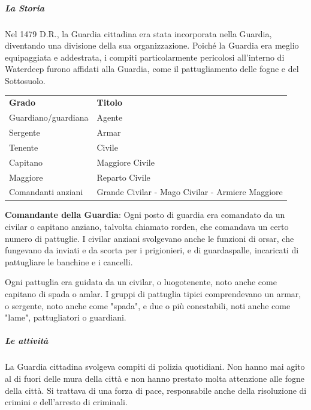 \documentclass{article}
\begin{document}
\subparagraph{La Storia}
Nel 1479 D.R., la Guardia cittadina era stata incorporata nella Guardia, diventando una divisione della sua organizzazione. Poiché la Guardia era meglio equipaggiata e addestrata, i compiti particolarmente pericolosi all'interno di Waterdeep furono affidati alla Guardia, come il pattugliamento delle fogne e del Sottosuolo.
                        \begin{center}
                          \begin{tabular}{ll}
                         
                          \textbf{Grado} & \textbf{Titolo} \\
                         
                          Guardiano/guardiana & Agente \\
                          Sergente & Armar \\
                          Tenente & Civile \\
                          Capitano & Maggiore Civile \\
                          Maggiore & Reparto Civile \\
                          Comandanti anziani & Grande Civilar - Mago Civilar - Armiere Maggiore \\
                         
                          \end{tabular}
                          \end{center}
                          
                          \textbf{Comandante della Guardia}: Ogni posto di guardia era comandato da un civilar o capitano anziano, talvolta chiamato rorden, che comandava un certo numero di pattuglie. I civilar anziani svolgevano anche le funzioni di orsar, che fungevano da inviati e da scorta per i prigionieri, e di guardaspalle, incaricati di pattugliare le banchine e i cancelli.
                          
                          Ogni pattuglia era guidata da un civilar, o luogotenente, noto anche come capitano di spada o amlar. I gruppi di pattuglia tipici comprendevano un armar, o sergente, noto anche come "spada", e due o più conestabili, noti anche come "lame", pattugliatori o guardiani.
                          \subparagraph{Le attività}
                          La Guardia cittadina svolgeva compiti di polizia quotidiani. Non hanno mai agito al di fuori delle mura della città e non hanno prestato molta attenzione alle fogne della città. Si trattava di una forza di pace, responsabile anche della risoluzione di crimini e dell'arresto di criminali.
                          
\end{document}
